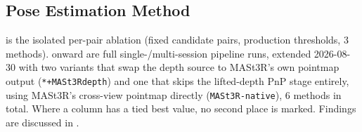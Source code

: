 \clearpage
\subsection{Pose Estimation Method}
\label{sec:appendix-ablation-pe}

 is the isolated per-pair
ablation (fixed candidate pairs, production thresholds, 3 methods). 
onward are full single-/multi-session pipeline runs, extended 2026-08-30 with two variants that
swap the depth source to MASt3R's own pointmap output (\texttt{*+MASt3Rdepth}) and one that skips
the lifted-depth PnP stage entirely, using MASt3R's cross-view pointmap directly
(\texttt{MASt3R-native}), 6 methods in total. Where a column has a tied best value, no second
place is marked. Findings are discussed in .


